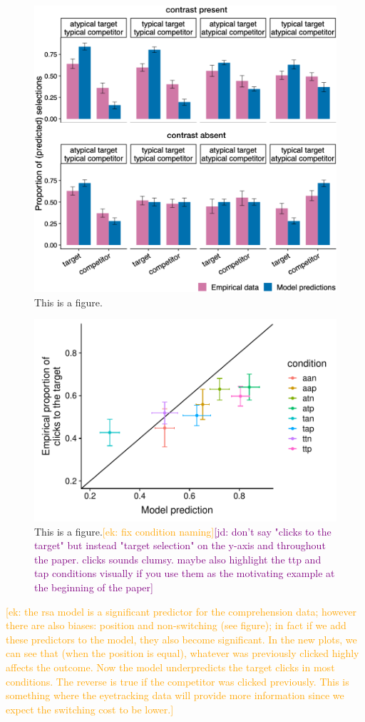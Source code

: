 \documentclass[10pt,letterpaper]{article}
\newcommand{\ek}[1]{\textcolor{Orange}{[ek: #1]}}
\newcommand{\jd}[1]{\textcolor{Purple}{[jd: #1]}}
\begin{document}
\begin{figure}
	\begin{center}
		\includegraphics[width=.475\textwidth]{graphs/model-bycond-paper.pdf}
	\end{center}
\caption{This is a figure.} 
\label{model-results-flatprior}
\end{figure}

\begin{figure}
	\begin{center}
		\includegraphics[width=.475\textwidth]{graphs/corr-modelflat-bycondition.pdf}
	\end{center}
\caption{This is a figure.\ek{fix condition naming}\jd{don't say "clicks to the target" but instead "target selection" on the y-axis and throughout the paper. clicks sounds clumsy. maybe also highlight the ttp and tap conditions visually if you use them as the motivating example at the beginning of the paper}} 
\label{model-results-corr-flatprior}
\end{figure}

\ek{the rsa model is a significant predictor for the comprehension data; however there are also biases: position and non-switching (see figure); in fact if we add these predictors to the model, they also become significant. In the new plots, we can see that (when the position is equal), whatever was previously clicked highly affects the outcome. Now the model underpredicts the target clicks in most conditions. The reverse is true if the competitor was clicked previously. This is something where the eyetracking data will provide more information since we expect the switching cost to be lower.}
\end{document}
